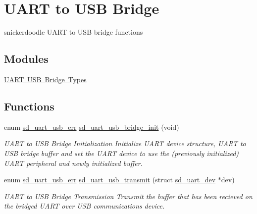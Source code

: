 \hypertarget{group___s_d___u_a_r_t___u_s_b___bridge}{}\section{U\+A\+RT to U\+SB Bridge}
\label{group___s_d___u_a_r_t___u_s_b___bridge}


snickerdoodle U\+A\+RT to U\+SB bridge functions  


\subsection*{Modules}
\begin{DoxyCompactItemize}
\item 
\mbox{\hyperlink{group___s_d___u_a_r_t___u_s_b___bridge___types}{U\+A\+R\+T U\+S\+B Bridge Types}}
\end{DoxyCompactItemize}
\subsection*{Functions}
\begin{DoxyCompactItemize}
\item 
enum \mbox{\hyperlink{group___s_d___u_a_r_t___u_s_b___bridge___types_ga7e4773a8cce69fafe541cad55985f146}{sd\+\_\+uart\+\_\+usb\+\_\+err}} \mbox{\hyperlink{group___s_d___u_a_r_t___u_s_b___bridge_gaa03f4625c66a0fe3be62a6aead8ac2ba}{sd\+\_\+uart\+\_\+usb\+\_\+bridge\+\_\+init}} (void)
\begin{DoxyCompactList}\small\item\em U\+A\+RT to U\+SB Bridge Initialization Initialize U\+A\+RT device structure, U\+A\+RT to U\+SB bridge buffer and set the U\+A\+RT device to use the (previously initialized) U\+A\+RT peripheral and newly initialized buffer. \end{DoxyCompactList}\item 
enum \mbox{\hyperlink{group___s_d___u_a_r_t___u_s_b___bridge___types_ga7e4773a8cce69fafe541cad55985f146}{sd\+\_\+uart\+\_\+usb\+\_\+err}} \mbox{\hyperlink{group___s_d___u_a_r_t___u_s_b___bridge_ga7277fee3051720471dd68980c4928cbc}{sd\+\_\+uart\+\_\+usb\+\_\+transmit}} (struct \mbox{\hyperlink{structsd__uart__dev}{sd\+\_\+uart\+\_\+dev}} $\ast$dev)
\begin{DoxyCompactList}\small\item\em U\+A\+RT to U\+SB Bridge Transmission Transmit the buffer that has been recieved on the bridged U\+A\+RT over U\+SB communications device. \end{DoxyCompactList}\end{DoxyCompactItemize}


